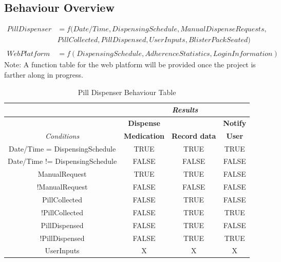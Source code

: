 \documentclass[12pt,titlepage]{article}
\begin{document}
\subsection{Behaviour Overview}
\vspace{-.5cm}
\begin{align*}
    PillDispenser &= f(Date/Time, DispensingSchedule, ManualDispenseRequests, \\ &  PillCollected, PillDispensed, UserInputs, BlisterPackSeated) \\ \\
    WebPlatform &= f(DispensingSchedule, AdherenceStatistics, LoginInformation) %
\end{align*}
Note: A function table for the web platform will be provided once the project is farther along in progress. 

\begin{table}[ht!]
\begin{center}
\begin{adjustbox}{max width=\textwidth}
\small
\begin{tabular}{| c | c | c | c |}
\hline
  & \multicolumn{3}{c|}{\textit{Results}}\\
 \hline 
  & \textbf{Dispense} & \textbf{} & \textbf{Notify}\\
 \textit{Conditions} & \textbf{Medication} & \textbf{Record data} & \textbf{User}\\
 \hline 
 Date/Time = DispensingSchedule & TRUE & TRUE & TRUE\\
 \hline
  Date/Time != DispensingSchedule & FALSE & FALSE & FALSE\\
 \hline
  ManualRequest & TRUE & TRUE & FALSE\\
 \hline
  !ManualRequest & FALSE & FALSE & FALSE\\
  \hline
   PillCollected & FALSE & TRUE & FALSE\\
 \hline
  !PillCollected & FALSE & TRUE & TRUE\\
 \hline
 PillDispensed & FALSE & TRUE & FALSE\\
 \hline
 !PillDispensed & FALSE & TRUE & TRUE\\
 \hline
  UserInputs & X & X & X\\
 \hline
\end{tabular}
\end{adjustbox}
\end{center}
\caption{Pill Dispenser Behaviour Table}
\end{table}

\pagebreak
\end{document}
